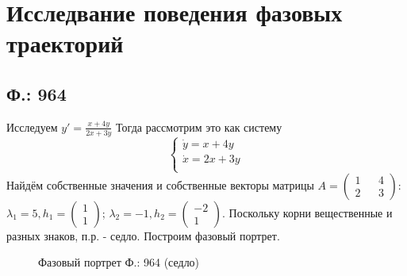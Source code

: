 \documentclass{article}
\begin{document}
\section{Исследвание поведения фазовых траекторий}

\textcolor[rgb]{1,1,1}{ }
\subsection{Ф.: 964}
Исследуем $y'=\frac{x+4y}{2x+3y}$ Тогда рассмотрим это как систему 
\begin{equation}
\begin{cases}
        \dot{y}=x+4y\\
        \dot{x}=2x+3y\\
    \end{cases}    
\end{equation}
Найдём собственные значения и собственные векторы матрицы $A=\begin{pmatrix}1 && 4 \\ 2 && 3 \end{pmatrix}$:\\
 $\lambda_1= 5,h_1 = \begin{pmatrix}1  \\  1 \end{pmatrix} $; $\lambda_2= -1,h_2 = \begin{pmatrix} -2  \\  1 \end{pmatrix} $. Поскольку корни вещественные и разных знаков, п.р. - седло. Построим фазовый портрет.
 \begin{figure}[ht]
\caption{Фазовый портрет Ф.: 964 (седло)}
\label{964}
\end{figure}
\end{document}
